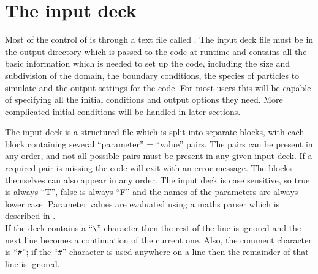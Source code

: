 \section{\texorpdfstring
  {The {\EPOCH} input deck}
  {The {EPOCH} input deck}}
\label{sec:input}
Most of the control of {\EPOCH} is through a text file called .
The input deck file must be in the output directory which is passed to the
code at runtime and contains all the basic
information which is needed to set up the code, including the size and
subdivision of the domain, the boundary conditions, the species of particles to
simulate and the output settings for the code. For most users this will be
capable of specifying all the initial conditions and output options they need.
More complicated initial conditions will be handled in later sections.

The input deck is a structured
file which is split into separate blocks, with each block containing several
``parameter'' = ``value'' pairs. The pairs can be present in any order, and not
all possible pairs must be present in any given input deck. If a required pair
is missing the code will exit with an error message. The blocks themselves can
also appear in any order. The input deck is case
sensitive, so true is always ``T'', false is always ``F'' and the names of
the parameters are always lower case.
Parameter values are evaluated using a maths parser which is described in
.\\

If the deck contains a ``\verb|\|'' character then the rest of the line
is ignored and the next line becomes a continuation of the current one. Also,
the comment character is ``\verb|#|''; if the ``\verb|#|'' character is used
anywhere on a line then the remainder of that line is ignored.\\

